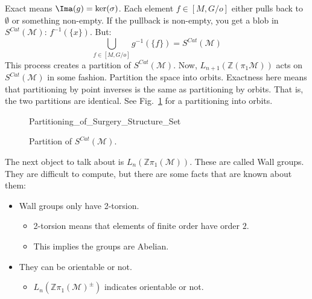 \documentclass[crop=false,class=book,oneside]{standalone}                      %
\begin{document}
            Exact means $\Ima(g)=\ker(\sigma)$.
            Each element $f\in{[M,G/o]}$
            either pulls back to $\emptyset$ or
            something non-empty. If the pullback is non-empty,
            you get a blob in
            $S^{Cat}(\mathcal{M})$: $f^{-1}(\{x\})$.
            But:
            \begin{equation}
                \bigcup_{f\in[M,G/o]}g^{-1}(\{f\})
                =S^{Cat}(\mathcal{M})
            \end{equation}
            This process creates a partition of
            $S^{Cat}(\mathcal{M})$. Now,
            $L_{n+1}(\mathbb{Z}(\pi_{1}\mathcal{M}))$
            acts on $S^{Cat}(\mathcal{M})$ in some fashion.
            Partition the space into orbits. Exactness
            here means that partitioning by point inverses
            is the same as partitioning by orbits. That is,
            the two partitions are identical. See
            Fig.~\ref{fig:surgery_theory_partition_of_S_Cat}
            for a partitioning into orbits.
            \newpage
            \begin{figure}[H]
                \centering
                \captionsetup{type=figure}
                
                          {Partitioning_of_Surgery_Structure_Set}
                \caption{Partition of $S^{Cat}(\mathcal{M})$.}
                \label{fig:surgery_theory_partition_of_S_Cat}
            \end{figure}
            The next object to talk about is
            $L_{n}(\mathbb{Z}\pi_{1}(\mathcal{M}))$.
            These are called Wall groups.
            They are difficult to compute,
            but there are some facts that are known about them:
            \begin{itemize}
                \item Wall groups only have 2-torsion.
                \begin{itemize}
                    \item 2-torsion means that elements
                          of finite order have order $2$.
                    \item This implies the groups are Abelian.
                \end{itemize}
                \item They can be orientable or not.
                \begin{itemize}
                    \item $L_{n}(%
                           \mathbb{Z}\pi_{1}(\mathcal{M})^{\pm})$
                           indicates orientable or not.
                \end{itemize}
            \end{itemize}
\end{document}
